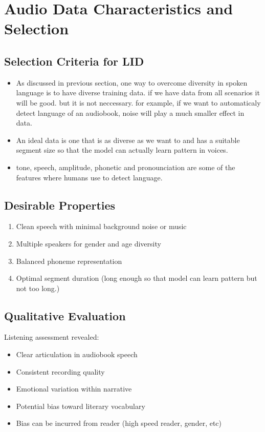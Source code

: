 \documentclass[12pt,a4paper]{article}
\begin{document}
	\section{Audio Data Characteristics and Selection}
	
	\subsection{Selection Criteria for LID}
	\begin{itemize}
		\item As discussed in previous section, one way to overcome diversity in spoken language is to have diverse training data. if we have data from all scenarios it will be good. but it is not neccessary. for example, if we want to automaticaly detect language of an audiobook, noise will play a much smaller effect in data.
		\item An ideal data is one that is as diverse as we want to and has a suitable segment size so that the model can actually learn pattern in voices.
		\item tone, speech, amplitude, phonetic and pronounciation are some of the features where humans use to detect language. 
	\end{itemize}
	
	\subsection{Desirable Properties}
	\begin{enumerate}
		\item Clean speech with minimal background noise or music
		\item Multiple speakers for gender and age diversity
		\item Balanced phoneme representation
		\item Optimal segment duration (long enough so that model can learn pattern but not too long.)
	\end{enumerate}
	
	\subsection{Qualitative Evaluation}
	Listening assessment revealed:
	\begin{itemize}
		\item Clear articulation in audiobook speech
		\item Consistent recording quality
		\item Emotional variation within narrative
		\item Potential bias toward literary vocabulary
		\item Bias can be incurred from reader (high speed reader, gender, etc)
	\end{itemize}
	
\end{document}
